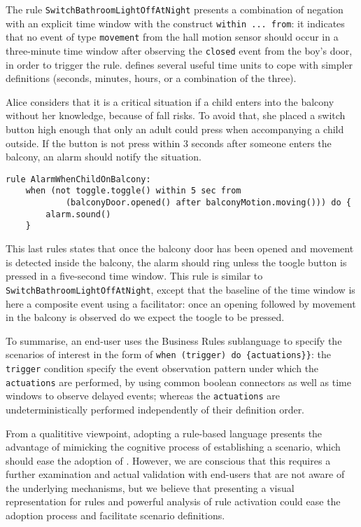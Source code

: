 \begin{description}[leftmargin=0cm]
	The rule \lstinline[language=iotdsl]{SwitchBathroomLightOffAtNight} presents a combination of negation with an explicit time window with the construct \lstinline[language=iotdsl]{within ... from}: it indicates that no event of type \lstinline[language=iotdsl]{movement} from the hall motion sensor should occur in a three-minute time window after observing the \lstinline[language=iotdsl]{closed} event from the boy's door, in order to trigger the rule. \IOTDSL defines several useful time units to cope with simpler definitions (seconds, minutes, hours, or a combination of the three). 
	

	\item[Report unsupervised children on balcony] Alice considers that it is a critical situation if a child enters into the balcony without her knowledge, because of fall risks. To avoid that, she placed a switch button high enough that only an adult could press when accompanying a child outside. If the button is not press within 3 seconds after someone enters the balcony, an alarm should notify the situation.
	\begin{lstlisting}[language=iotdsl,
							label=lis:balcony-rule,
		caption=Rules to ring the alarm in case of an unsupervised child in the balcony]
rule AlarmWhenChildOnBalcony:	
	when (not toggle.toggle() within 5 sec from
			(balconyDoor.opened() after balconyMotion.moving())) do {
		alarm.sound()
	}
	\end{lstlisting}
	This last rules states that once the balcony door has been opened and movement is detected inside the balcony, the alarm should ring unless the toogle button is pressed in a five-second time window. This rule is similar to \lstinline[language=iotdsl]{SwitchBathroomLightOffAtNight}, except that the baseline of the time window is here a composite event using a facilitator: once an opening followed by movement in the balcony is observed do we expect the toogle to be pressed. 
\end{description}
To summarise, an end-user uses the Business Rules sublanguage to specify the scenarios of interest in the form of \lstinline[language=iotdsl]!when (trigger) do {actuations}}!: the \lstinline[language=iotdsl]{trigger} condition specify the event observation pattern under which the \lstinline[language=iotdsl]{actuations} are performed, by using common boolean connectors as well as time windows to observe delayed events; whereas the \lstinline[language=iotdsl]{actuations} are undeterministically performed independently of their definition order. 

From a qualititive viewpoint, adopting a rule-based language presents the advantage of mimicking the cognitive process of establishing a scenario, which should ease the adoption of \IOTDSL. However, we are conscious that this requires a further examination and actual validation with end-users that are not aware of the underlying \DSL mechanisms, but we believe that presenting a visual representation for rules and powerful analysis of rule activation could ease the adoption process and facilitate scenario definitions.



